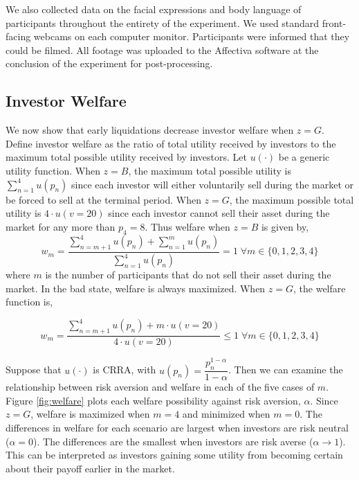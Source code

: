 \documentclass[11pt]{article}
\begin{document}
We also collected data on the facial expressions and body language of participants throughout the entirety of the experiment. We used standard front-facing webcams on each computer monitor. Participants were informed that they could be filmed. All footage was uploaded to the Affectiva software at the conclusion of the experiment for post-processing.



\subsection{Investor Welfare}

We now show that early liquidations decrease investor welfare when $z = G$. Define investor welfare as the ratio of total utility
received by investors to the maximum total possible utility received by investors. Let $u(\cdot)$ be a generic utility function. When $z=B$, the maximum total possible utility is $\sum_{n=1}^{4} u(p_n)$
since each investor will either voluntarily sell during the market or be forced to sell at the terminal period. When $z=G$, the maximum possible total utility is $4 \cdot u(v=20)$ since each investor cannot sell
their asset during the market for any more than $p_4=8$. Thus welfare when $z=B$ is given by,
\begin{equation}
  w_m = \dfrac{\sum_{n=m+1}^{4} u(p_n) + \sum_{n=1}^{m} u(p_n)}{\sum_{n=1}^{4} u(p_n)} = 1 \; \forall m \in \{0,1,2,3,4\}
  \label{eq:welfare_bad}
\end{equation}
where $m$ is the number of participants that do not sell their asset during the market. In the bad state, welfare is always maximized. When $z=G$, the welfare function is,

\begin{equation}
  w_m = \dfrac{\sum_{n=m+1}^{4} u(p_n) + m\cdot u(v=20)}{4 \cdot u(v=20)} \le 1 \; \forall m \in \{0,1,2,3,4\}
  \label{eq:welfare_good}
\end{equation}

Suppose that $u(\cdot)$ is CRRA, with $u(p_n) = \dfrac{p_n^{1-\alpha}}{1-\alpha}$. Then we can examine the relationship between risk aversion and welfare
in each of the five cases of $m$. Figure \ref{fig:welfare} plots each welfare possibility against risk aversion, $\alpha$. Since $z=G$, welfare is maximized
when $m=4$ and minimized when $m=0$. The differences in welfare for each scenario are largest when investors are risk neutral ($\alpha = 0$). The differences
are the smallest when investors are risk averse ($\alpha \rightarrow 1$). This can be interpreted as investors gaining some utility from becoming certain about
their payoff earlier in the market.
\end{document}
